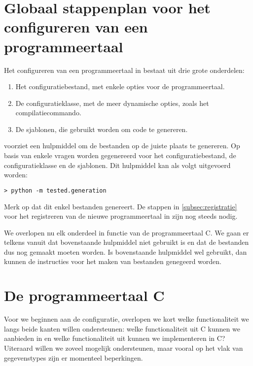 \section{Globaal stappenplan voor het configureren van een programmeertaal}\label{sec:globaal-stappenplan-voor-het-configureren}

Het configureren van een programmeertaal in \tested{} bestaat uit drie grote onderdelen:

\begin{enumerate}
    \item Het configuratiebestand, met enkele opties voor de programmeertaal.
    \item De configuratieklasse, met de meer dynamische opties, zoals het compilatiecommando.
    \item De sjablonen, die gebruikt worden om code te genereren.
\end{enumerate}

\tested{} voorziet een hulpmiddel om de bestanden op de juiste plaats te genereren.
Op basis van enkele vragen worden  gegenereerd voor het configuratiebestand, de configuratieklasse en de sjablonen.
Dit hulpmiddel kan als volgt uitgevoerd worden:

\begin{verbatim}
> python -m tested.generation
\end{verbatim}

Merk op dat dit enkel bestanden genereert.
De stappen in \cref{subsec:registratie} voor het registreren van de nieuwe programmeertaal in \tested{} zijn nog steeds nodig.

We overlopen nu elk onderdeel in functie van de programmeertaal C\@.
We gaan er telkens vanuit dat bovenstaande hulpmiddel niet gebruikt is en dat de bestanden dus nog gemaakt moeten worden.
Is bovenstaande hulpmiddel wel gebruikt, dan kunnen de instructies voor het maken van bestanden genegeerd worden.

\section{De programmeertaal C}\label{sec:de-programmeertaal-c}

Voor we beginnen aan de configuratie, overlopen we kort welke functionaliteit we langs beide kanten willen ondersteunen: welke functionaliteit uit C kunnen we aanbieden in \tested{} en welke functionaliteit uit \tested{} kunnen we implementeren in C?
Uiteraard willen we zoveel mogelijk ondersteunen, maar vooral op het vlak van gegevenstypes zijn er momenteel beperkingen.

